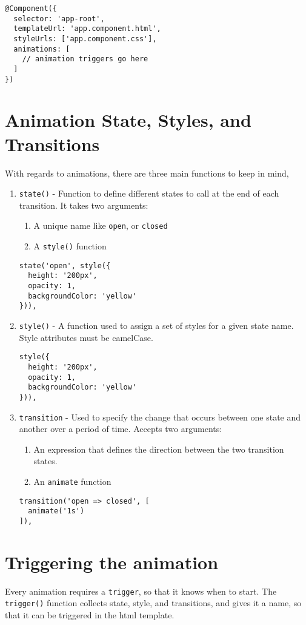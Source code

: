 \begin{lstlisting}
@Component({
  selector: 'app-root',
  templateUrl: 'app.component.html',
  styleUrls: ['app.component.css'],
  animations: [
    // animation triggers go here
  ]
})  
\end{lstlisting}

\section{ Animation State, Styles, and Transitions }
With regards to animations, there are three main functions to keep in mind, 
\begin{enumerate}
  \item \lstinline{state()} - Function to define different states to call at 
  the end of each transition. It takes two arguments: 
    \begin{enumerate}
      \item A unique name like \lstinline{open}, or \lstinline{closed}
      \item A \lstinline{style()} function 
    \end{enumerate}
    \begin{lstlisting}  
state('open', style({
  height: '200px',
  opacity: 1,
  backgroundColor: 'yellow'
})),
    \end{lstlisting}  
  \item \lstinline{style()} - A function used to assign a set of styles for 
  a given state name. Style attributes must be camelCase.
    \begin{lstlisting}
style({
  height: '200px',
  opacity: 1,
  backgroundColor: 'yellow'
})),
    \end{lstlisting}
  \item \lstinline{transition} - Used to specify the change that occurs 
  between one state and another over a period of time. Accepts two arguments: 
    \begin{enumerate}
      \item An expression that defines the direction between the two 
      transition states. 
      \item An \lstinline{animate} function
    \end{enumerate}
    \begin{lstlisting}
transition('open => closed', [
  animate('1s')
]),
    \end{lstlisting}
\end{enumerate}

\section{Triggering the animation}
Every animation requires a \lstinline{trigger}, so that it knows when to start. 
The \lstinline{trigger()} function collects state, style, and transitions,
and gives it a name, so that it can be triggered in the html template. 

